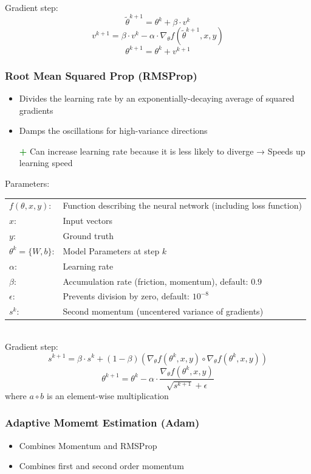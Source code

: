 \documentclass[10pt,a4paper]{article}
\newcommand{\pros}{\textcolor{green}{\textbf{+}}}
\begin{document}
Gradient step:
$$
	\tilde \theta^{k + 1} = \theta^k + \beta ⋅ v^k
$$
$$
	v^{k + 1} = \beta ⋅ v^k - \alpha ⋅ \nabla_\theta f(\tilde \theta^{k + 1}, x, y)
$$
$$
	\theta^{k + 1} = \theta^k + v^{k + 1}
$$

\subsubsection{Root Mean Squared Prop (RMSProp)}
\begin{itemize}
	\item Divides the learning rate by an exponentially-decaying average of squared gradients
	\item Damps the oscillations for high-variance directions
	\item[\pros] Can increase learning rate because it is less likely to diverge → Speeds up learning speed
\end{itemize}

Parameters: \\
\begin{tabular}{ll}
	$f(\theta, x, y)$: & Function describing the neural network (including loss function) \\
	$x$: & Input vectors \\
	$y$: & Ground truth \\
	$\theta^k = \{W, b\}$: & Model Parameters at step $k$\\
	$\alpha$: & Learning rate \\
	$\beta$: & Accumulation rate (friction, momentum), default: $0.9$ \\
	$\epsilon$: & Prevents division by zero, default: $10^{-8}$ \\
	$s^k$: & Second momentum (uncentered variance of gradients)
\end{tabular} \\

Gradient step:
$$
	s^{k + 1} = \beta ⋅ s^k + (1 - \beta)(\nabla_\theta f(\theta^k, x, y) \circ \nabla_\theta f(\theta^k, x, y))
$$
$$
	\theta^{k + 1} = \theta^k - \alpha ⋅ \frac{\nabla_\theta f(\theta^k, x, y)}{\sqrt{s^{k + 1}} + \epsilon}
$$
where $a \circ b$ is an element-wise multiplication

\subsubsection{Adaptive Momemt Estimation (Adam)}
\begin{itemize}
	\item Combines Momentum and RMSProp
	\item Combines first and second order momentum
\end{itemize}
\end{document}
